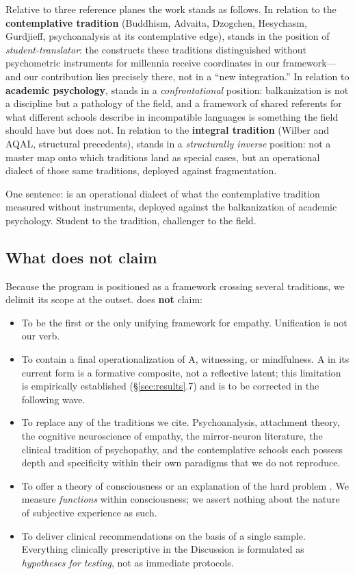 Relative to three reference planes the work stands as follows. In relation to the \textbf{contemplative tradition} (Buddhism, Advaita, Dzogchen, Hesychasm, Gurdjieff, psychoanalysis at its contemplative edge), \DEIC{} stands in the position of \emph{student-translator}: the constructs these traditions distinguished without psychometric instruments for millennia receive coordinates in our framework---and our contribution lies precisely there, not in a ``new integration.'' In relation to \textbf{academic psychology}, \DEIC{} stands in a \emph{confrontational} position: balkanization is not a discipline but a pathology of the field, and a framework of shared referents for what different schools describe in incompatible languages is something the field should have but does not. In relation to the \textbf{integral tradition} (Wilber and AQAL, structural precedents), \DEIC{} stands in a \emph{structurally inverse} position: not a master map onto which traditions land as special cases, but an operational dialect of those same traditions, deployed against fragmentation.

One sentence: \DEIC{} is an operational dialect of what the contemplative tradition measured without instruments, deployed against the balkanization of academic psychology. Student to the tradition, challenger to the field.

\subsection{What \DEIC{} does not claim}

Because the program is positioned as a framework crossing several traditions, we delimit its scope at the outset. \DEIC{} does \textbf{not} claim:
\begin{itemize}
    \item To be the first or the only unifying framework for empathy. Unification is not our verb.
    \item To contain a final operationalization of A, witnessing, or mindfulness. A in its current form is a formative composite, not a reflective latent; this limitation is empirically established (§\ref{sec:results}.7) and is to be corrected in the following wave.
    \item To replace any of the traditions we cite. Psychoanalysis, attachment theory, the cognitive neuroscience of empathy, the mirror-neuron literature, the clinical tradition of psychopathy, and the contemplative schools each possess depth and specificity within their own paradigms that we do not reproduce.
    \item To offer a theory of consciousness or an explanation of the hard problem \citep{chalmers1995}. We measure \emph{functions} within consciousness; we assert nothing about the nature of subjective experience as such.
    \item To deliver clinical recommendations on the basis of a single sample. Everything clinically prescriptive in the Discussion is formulated as \emph{hypotheses for testing}, not as immediate protocols.
\end{itemize}

